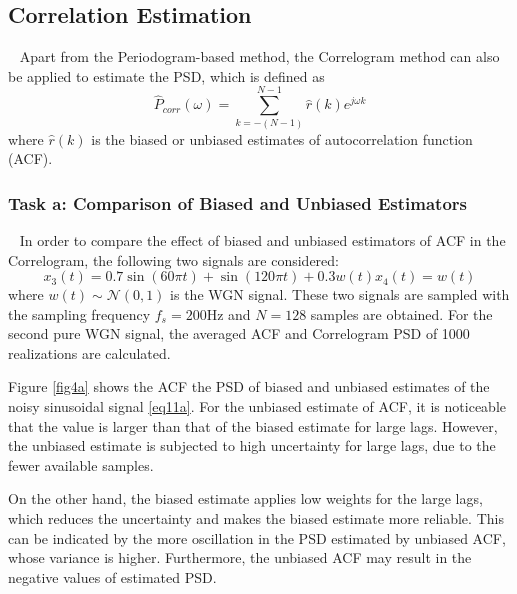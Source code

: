 \documentclass[10pt]{article}
\begin{document}
\subsection{Correlation Estimation}
\ \indent
Apart from the Periodogram-based method, the Correlogram method can also 
be applied to estimate the PSD, which is defined as 
\begin{equation}
	{\hat{P}}_{corr}\left(\omega\right)=\sum_{k=-\left(N-1\right)}^{N-1}{\hat{r}\left(k\right)e^{j\omega k}} \label{eq10}
\end{equation}
where $\hat{r}\left(k\right)$ is the biased or unbiased estimates of 
autocorrelation function (ACF).

\subsubsection{Task a: Comparison of Biased and Unbiased Estimators}
\ \indent
In order to compare the effect of biased and unbiased estimators of 
ACF in the Correlogram, the following two signals are considered:
\begin{subequations}
	\begin{equation}
		x_3\left(t\right)=0.7\sin{\left(60\pi t\right)}+\sin\left(120\pi t\right)+0.3w\left(t\right) \label{eq11a}
	\end{equation}
	\begin{equation}
		x_4\left(t\right)=w\left(t\right) \label{eq11b}
	\end{equation}
\end{subequations}
where $w\left(t\right) \sim \mathcal{N}(0,1)$ is the WGN signal. 
These two signals are sampled with the sampling frequency $f_s=200$Hz 
and $N=128$ samples are obtained. For the second pure WGN signal, the 
averaged ACF and Correlogram PSD of 1000 realizations are calculated.

Figure \ref{fig4a} shows the ACF the PSD of biased and unbiased estimates of the 
noisy sinusoidal signal \eqref{eq11a}. For the unbiased estimate of ACF, it is 
noticeable that the value is larger than that of the biased estimate for 
large lags. However, the unbiased estimate is subjected to high uncertainty for large 
lags, due to the fewer available samples.

On the other hand, the biased estimate applies low weights for the large 
lags, which reduces the uncertainty and makes the biased estimate more 
reliable. This can be indicated by the more oscillation in the PSD 
estimated by unbiased ACF, whose variance is higher. 
Furthermore, the unbiased ACF may result in the negative values of 
estimated PSD.
\end{document}
